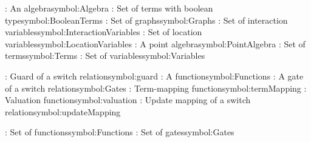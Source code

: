 \begin{tabbing}
\addsymbol \Algebra: {An algebra}{symbol:Algebra}
\addsymbol \BooleanTerms: {Set of terms with boolean type}{symbol:BooleanTerms}
\addsymbol \Graphs: {Set of graphs}{symbol:Graphs}
\addsymbol \InteractionVariables: {Set of interaction variables}{symbol:InteractionVariables}
\addsymbol \LocationVariables: {Set of location variables}{symbol:LocationVariables}
\addsymbol \PointAlgebra: {A point algebra}{symbol:PointAlgebra}
\addsymbol \Terms: {Set of terms}{symbol:Terms}
\addsymbol \Variables: {Set of variables}{symbol:Variables}

\addsymbol \guard: {Guard of a switch relation}{symbol:guard}
\addsymbol \function: {A function}{symbol:Functions}
\addsymbol \gate: {A gate of a switch relation}{symbol:Gates}
\addsymbol \termMapping: {Term-mapping function}{symbol:termMapping}
\addsymbol \valuation: {Valuation function}{symbol:valuation}
\addsymbol \updateMapping: {Update mapping of a switch relation}{symbol:updateMapping}

\addsymbol \Functions: {Set of functions}{symbol:Functions}
\addsymbol \Gates: {Set of gates}{symbol:Gates}

\end{tabbing}
